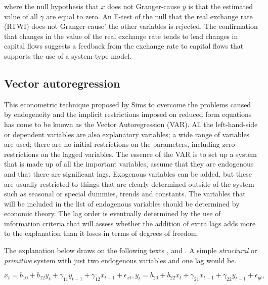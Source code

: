 \documentclass[12pt, a4paper, oneside]{article}\usepackage[]{graphicx}\usepackage[]{color}
\begin{document}
where the null hypothesis that $x$ does not Granger-cause $y$ is that the estimated value of all $\gamma$ are equal to zero.  An F-test of the null that the real exchange rate (RTWI) does not Granger-cause' the other variables is rejected.  The confirmation that changes in the value of the real exchange rate tends to lead changes in capital flows suggests a feedback from the exchange rate to capital flows that supports the use of a system-type model.   

\subsection{Vector autoregression}
This econometric technique proposed by Sims to overcome the problems caused by endogeneity and the implicit restrictions imposed on reduced form equations has come to be known as the Vector Autoregression (VAR). All the left-hand-side or dependent variables are also  explanatory variables; a wide range of variables are used; there are no initial restrictions on the parameters, including zero restrictions on the lagged variables.   The essence of the VAR is to set up a system that is made up of all the important variables, assume that they are endogenous and that there are significant lags.  Exogenous variables can be added, but these are usually restricted to things that are clearly determined outside of the system such as seasonal or special dummies, trends and constants.   The variables that will be included in the list of endogenous variables should be determined by economic theory. The lag order is eventually determined by the use of information criteria that will assess whether the addition of extra lags adds more to the explanation than it loses in terms of degrees of freedom.  

The explanation below draws on the following texts \citep[pp. 297-335]{EndersTS}, \citep[pp. 291-350]{Hamilton} and \citep[pp. 586-607]{Green}.  A simple \emph{structural} or \emph{primitive} system with just two endogenous variables and one lag would be.

\begin{subequations}
\begin{equation}\label{primitivevarone}
x_{t}=b_{10}+b_{12}y_t+\gamma_{11}y_{t-1}+\gamma_{12}x_{t-1}+\epsilon_{xt}, 
\end{equation}

\begin{equation}\label{primitivevartwo}
y_{t}=b_{20}+b_{22}x_t+\gamma_{21}x_{t-1}+\gamma_{22}y_{t-1}+\epsilon_{yt},
 \end{equation}
\end{subequations}
\end{document}
